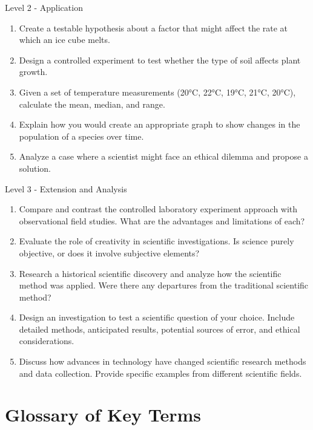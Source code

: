 \begin{tieredquestions}{Level 2 - Application}
\begin{enumerate}
    \item Create a testable hypothesis about a factor that might affect the rate at which an ice cube melts.
    \item Design a controlled experiment to test whether the type of soil affects plant growth.
    \item Given a set of temperature measurements (20°C, 22°C, 19°C, 21°C, 20°C), calculate the mean, median, and range.
    \item Explain how you would create an appropriate graph to show changes in the population of a species over time.
    \item Analyze a case where a scientist might face an ethical dilemma and propose a solution.
\end{enumerate}
\end{tieredquestions}

\begin{tieredquestions}{Level 3 - Extension and Analysis}
\begin{enumerate}
    \item Compare and contrast the controlled laboratory experiment approach with observational field studies. What are the advantages and limitations of each?
    \item Evaluate the role of creativity in scientific investigations. Is science purely objective, or does it involve subjective elements?
    \item Research a historical scientific discovery and analyze how the scientific method was applied. Were there any departures from the traditional scientific method?
    \item Design an investigation to test a scientific question of your choice. Include detailed methods, anticipated results, potential sources of error, and ethical considerations.
    \item Discuss how advances in technology have changed scientific research methods and data collection. Provide specific examples from different scientific fields.
\end{enumerate}
\end{tieredquestions}

\section{Glossary of Key Terms}


